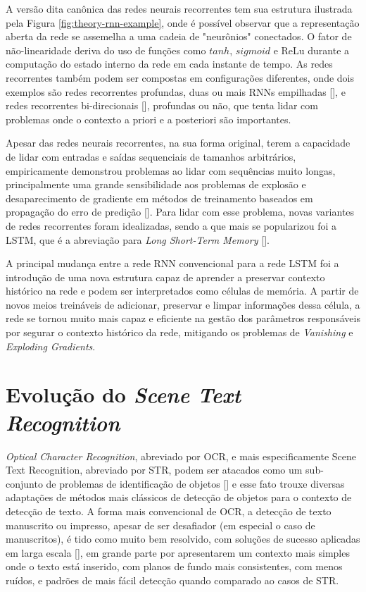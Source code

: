 A versão dita canônica das redes neurais recorrentes tem sua estrutura ilustrada pela Figura \ref{fig:theory-rnn-example}, onde é possível observar que a representação aberta da rede se assemelha a uma cadeia de "neurônios" conectados. O fator de não-linearidade deriva do uso de funções como $tanh$, $sigmoid$ e ReLu durante a computação do estado interno da rede em cada instante de tempo. As redes recorrentes também podem ser compostas em configurações diferentes, onde dois exemplos são redes recorrentes profundas, duas ou mais RNNs empilhadas [], e redes recorrentes bi-direcionais [], profundas ou não, que tenta lidar com problemas onde o contexto a priori e a posteriori são importantes.

Apesar das redes neurais recorrentes, na sua forma original, terem a capacidade de lidar com entradas e saídas sequenciais de tamanhos arbitrários, empiricamente demonstrou problemas ao lidar com sequências muito longas, principalmente uma grande sensibilidade aos problemas de explosão e desaparecimento de gradiente em métodos de treinamento baseados em propagação do erro de predição []. Para lidar com esse problema, novas variantes de redes recorrentes foram idealizadas, sendo a que mais se popularizou foi a LSTM, que é a abreviação para \textit{Long Short-Term Memory} [].

A principal mudança entre a rede RNN convencional para a rede LSTM foi a introdução de uma nova estrutura capaz de aprender a preservar contexto histórico na rede e podem ser interpretados como células de memória. A partir de novos meios treináveis de adicionar, preservar e limpar informações dessa célula, a rede se tornou muito mais capaz e eficiente na gestão dos parâmetros responsáveis por segurar o contexto histórico da rede, mitigando os problemas de \textit{Vanishing} e \textit{Exploding Gradients}. 


\section{Evolução do \textit{Scene Text Recognition}}
\textit{Optical Character Recognition}, abreviado por OCR, e mais especificamente Scene Text Recognition, abreviado por STR, podem ser atacados como um sub-conjunto de problemas de identificação de objetos [] e esse fato trouxe diversas adaptações de métodos mais clássicos de detecção de objetos para o contexto de detecção de texto. A forma mais convencional de OCR, a detecção de texto manuscrito ou impresso, apesar de ser desafiador (em especial o caso de manuscritos), é tido como muito bem resolvido, com soluções de sucesso aplicadas em larga escala [], em grande parte por apresentarem um contexto mais simples onde o texto está inserido, com planos de fundo mais consistentes, com menos ruídos, e padrões de mais fácil detecção quando comparado ao casos de STR.

